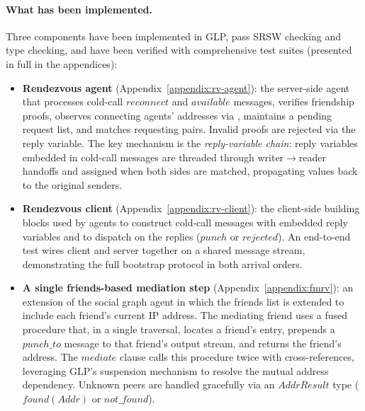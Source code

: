 \paragraph{What has been implemented.}
Three components have been implemented in GLP, pass SRSW checking and type checking, and have been verified with comprehensive test suites (presented in full in the appendices):
\begin{itemize}
\item \textbf{Rendezvous agent} (Appendix~\ref{appendix:rv-agent}): the server-side agent that processes cold-call $\mathit{reconnect}$ and $\mathit{available}$ messages, verifies friendship proofs, observes connecting agents' addresses via , maintains a pending request list, and matches requesting pairs.  Invalid proofs are rejected via the reply variable.  The key mechanism is the \emph{reply-variable chain}: reply variables embedded in cold-call messages are threaded through writer$\to$reader handoffs and assigned when both sides are matched, propagating values back to the original senders.

\item \textbf{Rendezvous client} (Appendix~\ref{appendix:rv-client}): the client-side building blocks used by agents to construct cold-call messages with embedded reply variables and to dispatch on the replies ($\mathit{punch}$ or $\mathit{rejected}$).  An end-to-end test wires client and server together on a shared message stream, demonstrating the full bootstrap protocol in both arrival orders.

\item \textbf{A single friends-based mediation step} (Appendix~\ref{appendix:fmrv}): an extension of the social graph agent in which the friends list is extended to include each friend's current IP address.  The mediating friend uses a fused  procedure that, in a single traversal, locates a friend's entry, prepends a $\mathit{punch\_to}$ message to that friend's output stream, and returns the friend's address.  The $\mathit{mediate}$ clause calls this procedure twice with cross-references, leveraging GLP's suspension mechanism to resolve the mutual address dependency.  Unknown peers are handled gracefully via an $\mathit{AddrResult}$ type ($\mathit{found}(\mathit{Addr})$ or $\mathit{not\_found}$).
\end{itemize}

